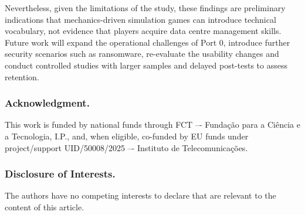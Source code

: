 \documentclass[runningheads]{llncs}
\begin{document}
Nevertheless, given the limitations of the study, these findings are preliminary indications that mechanics-driven simulation games can introduce technical vocabulary, not evidence that players acquire data centre management skills. Future work will expand the operational challenges of Port 0, introduce further security scenarios such as ransomware, re-evaluate the usability changes and conduct controlled studies with larger samples and delayed post-tests to assess retention.

\subsubsection*{Acknowledgment.}
This work is funded by national funds through FCT –- Fundação para a Ciência e
a Tecnologia, I.P., and, when eligible, co-funded by EU funds under project/support UID/50008/2025 –- Instituto de Telecomunicações.

\subsubsection*{Disclosure of Interests.}
The authors have no competing interests to declare that are relevant to the content of this article.
\end{document}
